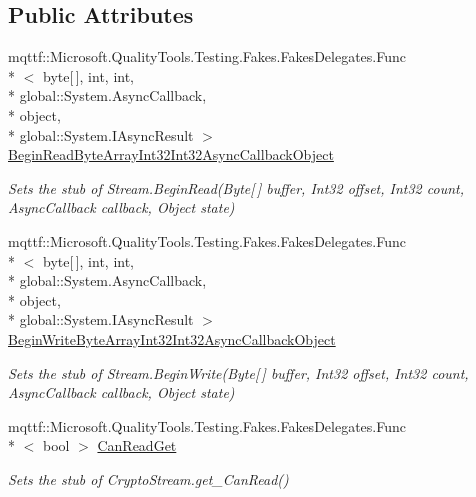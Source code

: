 \subsection*{Public Attributes}
\begin{DoxyCompactItemize}
\item 
mqttf\-::\-Microsoft.\-Quality\-Tools.\-Testing.\-Fakes.\-Fakes\-Delegates.\-Func\\*
$<$ byte\mbox{[}$\,$\mbox{]}, int, int, \\*
global\-::\-System.\-Async\-Callback, \\*
object, \\*
global\-::\-System.\-I\-Async\-Result $>$ \hyperlink{class_system_1_1_security_1_1_cryptography_1_1_fakes_1_1_stub_crypto_stream_ac0305cf89a1eb9c96e712d70ab101b89}{Begin\-Read\-Byte\-Array\-Int32\-Int32\-Async\-Callback\-Object}
\begin{DoxyCompactList}\small\item\em Sets the stub of Stream.\-Begin\-Read(\-Byte\mbox{[}$\,$\mbox{]} buffer, Int32 offset, Int32 count, Async\-Callback callback, Object state)\end{DoxyCompactList}\item 
mqttf\-::\-Microsoft.\-Quality\-Tools.\-Testing.\-Fakes.\-Fakes\-Delegates.\-Func\\*
$<$ byte\mbox{[}$\,$\mbox{]}, int, int, \\*
global\-::\-System.\-Async\-Callback, \\*
object, \\*
global\-::\-System.\-I\-Async\-Result $>$ \hyperlink{class_system_1_1_security_1_1_cryptography_1_1_fakes_1_1_stub_crypto_stream_aa97a496fae5bb30132891a9b385c5a25}{Begin\-Write\-Byte\-Array\-Int32\-Int32\-Async\-Callback\-Object}
\begin{DoxyCompactList}\small\item\em Sets the stub of Stream.\-Begin\-Write(\-Byte\mbox{[}$\,$\mbox{]} buffer, Int32 offset, Int32 count, Async\-Callback callback, Object state)\end{DoxyCompactList}\item 
mqttf\-::\-Microsoft.\-Quality\-Tools.\-Testing.\-Fakes.\-Fakes\-Delegates.\-Func\\*
$<$ bool $>$ \hyperlink{class_system_1_1_security_1_1_cryptography_1_1_fakes_1_1_stub_crypto_stream_af3d08df26b742d88e31a15ffef49ceee}{Can\-Read\-Get}
\begin{DoxyCompactList}\small\item\em Sets the stub of Crypto\-Stream.\-get\-\_\-\-Can\-Read()\end{DoxyCompactList}\item 

\end{DoxyCompactItemize}
